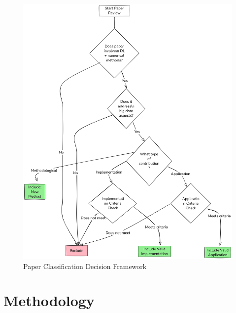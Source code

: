\documentclass[acmsmall]{acmart}
\begin{document}
\begin{figure}
    \centering
    \includegraphics[width=\textwidth]{media/Company Structure.png}
    \caption{Paper Classification Decision Framework}
    \label{fig:decision-flow}
\end{figure}

\section{Methodology}\label{sec:methodology}
\end{document}
